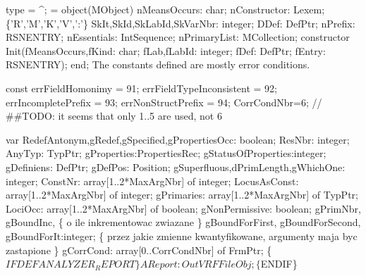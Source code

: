 \nwenddocs{}\endmoddef\nwstartdeflinemarkup{}\nwenddeflinemarkup
type
    = ^;
    =
      object(MObject)
         nMeansOccurs: char;
         nConstructor: Lexem; \{'R','M','K','V',':'\}
         SkIt,SkId,SkLabId,SkVarNbr: integer;
         DDef: DefPtr;
         nPrefix: RSNENTRY;
         nEssentials: IntSequence;
         nPrimaryList: MCollection;
         constructor
            Init(fMeansOccurs,fKind: char;
                 fLab,fLabId: integer;
                 fDef: DefPtr;
                 fEntry: RSNENTRY);
      end;
\eatline
{}\nwendcode{}\nwdocspar
The constants defined are mostly error conditions.

\nwenddocs{}\endmoddef\nwstartdeflinemarkup{}\nwenddeflinemarkup
const
   errFieldHomonimy = 91;
   errFieldTypeInconsistent = 92;
   errIncompletePrefix = 93;
   errNonStructPrefix = 94;
   CorrCondNbr=6;  // ##TODO: it seems that only 1..5 are used, not 6
\nwendcode{}\nwdocspar

\nwenddocs{}\endmoddef\nwstartdeflinemarkup{}\nwenddeflinemarkup
var
   RedefAntonym,gRedef,gSpecified,gPropertiesOcc: boolean;
   ResNbr: integer;
   AnyTyp: TypPtr;
   gProperties:PropertiesRec;
   gStatusOfProperties:integer;
   gDefiniens: DefPtr;
   gDefPos: Position;
   gSuperfluous,dPrimLength,gWhichOne: integer;
   ConstNr: array[1..2*MaxArgNbr] of integer;
   LocusAsConst: array[1..2*MaxArgNbr] of integer;
   gPrimaries: array[1..2*MaxArgNbr] of TypPtr;
   LociOcc: array[1..2*MaxArgNbr] of boolean;
   gNonPermissive: boolean;
   gPrimNbr,
   gBoundInc, \{ o ile inkrementowac zwiazane \}
   gBoundForFirst, gBoundForSecond, gBoundForIt:integer;
   \{ przez jakie zmienne kwantyfikowane, argumenty maja byc zastapione \}
   gCorrCond: array[0..CorrCondNbr] of FrmPtr;
   \{$IFDEF ANALYZER_REPORT\}
   AReport:OutVRFFileObj;
   \{$ENDIF\}   
\nwendcode{}\nwdocspar

